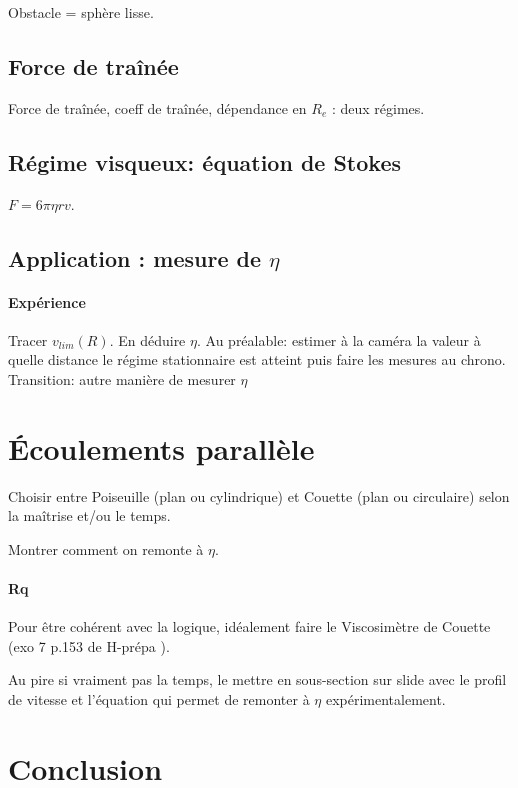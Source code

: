 \documentclass[11pt]{report}
\numberwithin{figure}{section}
\numberwithin{equation}{section}
\numberwithin{table}{section}
\newcommand{\1}{\boldsymbol{1}}
\begin{document}
Obstacle = sphère lisse.

\subsection{Force de traînée}

Force de traînée, coeff de traînée, dépendance en $R_e$ : deux régimes.

\subsection{Régime visqueux: équation de Stokes}

$F = 6 \pi \eta r v$.

\subsection{Application : mesure de $\eta$}

\paragraph*{Expérience} Tracer $v_{lim}(R)$. En déduire $\eta$. Au préalable: estimer à la caméra la valeur à quelle distance le régime stationnaire est atteint puis faire les mesures au chrono.
\\

\textcolor{mycolor5}{Transition: autre manière de mesurer $\eta$}



\section{Écoulements parallèle}

Choisir entre Poiseuille (plan ou cylindrique) et Couette (plan ou circulaire) selon la maîtrise et/ou le temps.

Montrer comment on remonte à $\eta$.

\paragraph*{Rq} Pour être cohérent avec la logique, idéalement faire le Viscosimètre de Couette (exo 7 p.153 de H-prépa ).

Au pire si vraiment pas la temps, le mettre en sous-section sur slide avec le profil de vitesse et l'équation qui permet de remonter à $\eta$ expérimentalement.

\section*{Conclusion}
  
\end{document}
